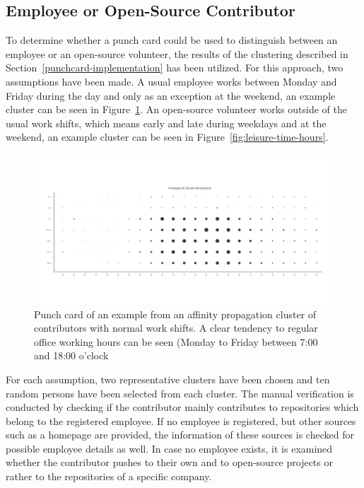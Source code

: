 \subsection{Employee or Open-Source Contributor}
To determine whether a punch card could be used to distinguish between an employee or an open-source volunteer, the results of the clustering described in Section~\ref{punchcard-implementation} has been utilized.
For this approach, two assumptions have been made.
A usual employee works between Monday and Friday during the day and only as an exception at the weekend, an example cluster can be seen in Figure~\ref{fig:normal-office-hours}.
An open-source volunteer works outside of the usual work shifts, which means early and late during weekdays and at the weekend, an example cluster can be seen in Figure~\ref{fig:leisure-time-hours}.

\begin{figure}[H]
    \includegraphics[scale=0.32]{./graphs/analysis-affinity/28}
    \centering
    \caption{Punch card of an example from an affinity propagation cluster of contributors with normal work shifts. A clear tendency to regular office working hours can be seen (Monday to Friday between 7:00 and 18:00 o'clock}\label{fig:normal-office-hours}
\end{figure}

For each assumption, two representative clusters have been chosen and ten random persons have been selected from each cluster.
The manual verification is conducted by checking if the contributor mainly contributes to repositories which belong to the registered employee.
If no employee is registered, but other sources such as a homepage are provided, the information of these sources is checked for possible employee details as well.
In case no employee exists, it is examined whether the contributor pushes to their own and to open-source projects or rather to the repositories of a specific company.

